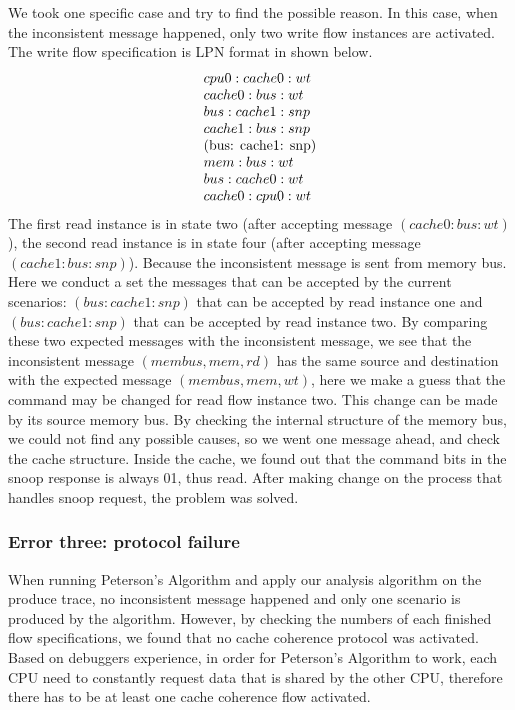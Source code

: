 \documentclass[12pt,frontmatter,copyright,thesis]{usfmanus}
\begin{document}
We took one specific case and try to find the possible reason.
In this case, when the inconsistent message happened, only two write flow instances
are activated. The write flow specification is LPN format in shown below.
\[
\begin{array}{l}
cpu0: cache0: wt\\
cache0: bus: wt\\
bus: cache1: snp\\
cache1: bus: snp\\
$(bus: cache1: snp)$\\
mem: bus: wt\\
bus: cache0: wt\\
cache0: cpu0: wt\\
\end{array}
\]
The first read instance is in state two (after accepting message $(cache0: bus: wt)$),
the second read instance is in state four (after accepting message $(cache1: bus: snp)$).
Because the inconsistent message is sent from memory bus. Here we conduct a set
the messages that can be accepted by the current scenarios: $(bus: cache1: snp)$ that can be accepted
by read instance one and $(bus: cache1: snp)$ that can be accepted by
read instance two. By comparing these two expected messages with
the inconsistent message, we see that the inconsistent message
$(membus, mem, rd)$ has the same source and destination with
the expected message $(membus, mem, wt)$, here we make
a guess that
the command may be changed for read flow instance two. This change
can be made by its source memory bus. By checking the internal structure
of the memory bus, we could not find any possible causes, so we went one
message ahead, and check the cache structure. Inside the cache,
we found out that the command bits in the snoop response
is always 01, thus read. After making change on the
process that handles snoop request, the problem was solved.


\subsubsection{Error three: protocol failure}


When running Peterson's Algorithm and apply our analysis algorithm on
the produce trace, no inconsistent message happened and only one scenario is produced
by the algorithm.
However, by checking the numbers of each finished flow specifications,
we found that no cache coherence protocol was activated. Based on debuggers experience, in order for Peterson's Algorithm to work, each CPU
need to constantly request data that is shared by the other CPU,
therefore there has to be at least one cache 
coherence flow activated.
\end{document}
